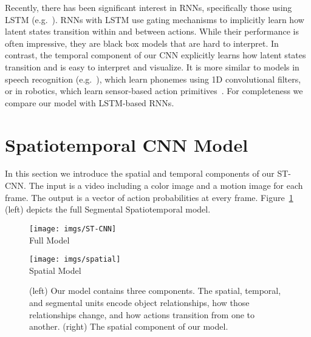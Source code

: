 \documentclass[runningheads]{llncs}
\begin{document}
Recently, there has been significant interest in RNNs, specifically those using LSTM (e.g.~\cite{ng_cvpr_2015,Vinyals_2015_CVPR,lrcn2014}). RNNs with LSTM use gating mechanisms to implicitly learn how latent states transition within and between actions.
While their performance is often impressive, they are black box models that are hard to interpret.
In contrast, the temporal component of our CNN explicitly learns how latent states transition and is easy to interpret and visualize. It is more similar to models in speech recognition (e.g.~\cite{ng_2015,abdel_interspeech_2013}), which learn phonemes using 1D convolutional filters, or in robotics, which learn sensor-based action primitives~\cite{lea_icra_2016}.
For completeness we compare our model with LSTM-based RNNs. 

















 \section{Spatiotemporal CNN Model}
\label{sec:model}

In this section we introduce the spatial and temporal components of our ST-CNN. 
The input is a video including a color image and a motion image for each frame. The output is a vector of action probabilities at every frame.
Figure~\ref{fig:model} (left) depicts the full Segmental Spatiotemporal model.


\begin{figure}[t]
\begin{minipage}[T]{0.5\linewidth}
			\begin{center}			
\texttt{[image: imgs/ST-CNN]}\\
			Full Model\\
	 		\end{center}			
		\end{minipage}
		\begin{minipage}[T]{0.5\linewidth}
			\begin{center}			
\texttt{[image: imgs/spatial]}\\
			  Spatial Model\\
			  \end{center}
		\end{minipage}
\caption{(left) Our model contains three components. The spatial, temporal, and segmental units encode object relationships, how those relationships change, and how actions transition from one to another. (right) The spatial component of our model.}
	\label{fig:model}
\end{figure}
\end{document}

